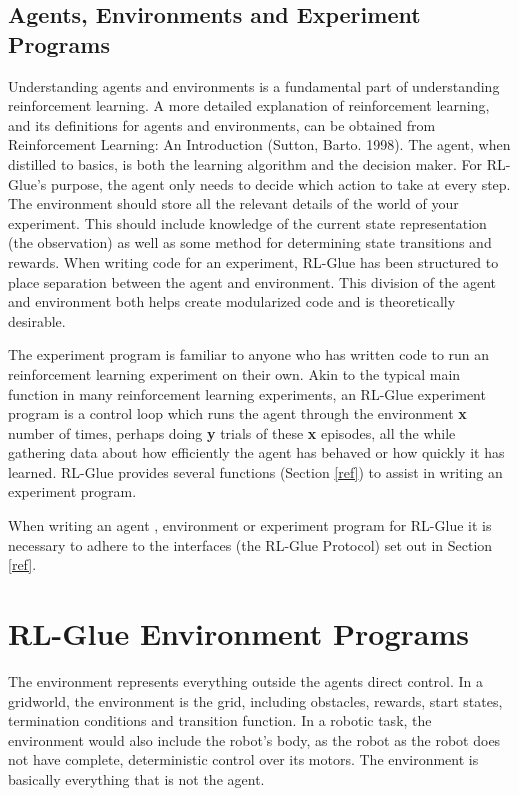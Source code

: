 \documentclass[11pt]{article}
\begin{document}
\subsection{Agents, Environments and Experiment Programs}
Understanding agents and environments is a fundamental part of understanding reinforcement learning. A more detailed explanation of reinforcement learning, and its definitions for agents and environments, can be obtained from Reinforcement Learning: An Introduction (Sutton, Barto. 1998).  The agent, when distilled to basics, is both the learning algorithm and the decision maker. For RL-Glue's purpose, the agent only needs to decide which action to take at every step. The environment should store all the relevant details of the world of your experiment. This should include knowledge of the current state representation (the observation) as well as some method for determining state transitions and rewards. When writing code for an experiment, RL-Glue has been structured to place separation between the agent and environment. This division of the agent and environment both helps create modularized code and is theoretically desirable.


The experiment program is familiar to anyone who has written code to run an reinforcement learning experiment on their own. Akin to the typical main function in many reinforcement learning experiments, an RL-Glue experiment program is a control loop which runs the agent through the environment {\bf x} number of times, perhaps doing {\bf y} trials of these {\bf x} episodes, all the while gathering data about how efficiently the agent has behaved or how quickly it has learned. RL-Glue provides several functions (Section \ref{ref}) to assist in writing an experiment program.


When writing an agent , environment or experiment program for RL-Glue it is necessary to adhere to the interfaces (the RL-Glue Protocol) set out in Section \ref{ref}. 

\section{RL-Glue Environment Programs}
\label{env}
The environment represents everything outside the agents direct control. In a gridworld, the environment is the grid, including obstacles, rewards, start states, termination conditions and transition function. In a robotic task, the environment would also include the robot's body, as the robot as the robot does not have complete, deterministic control over its motors. The environment is basically everything that is not the agent.
\end{document}
